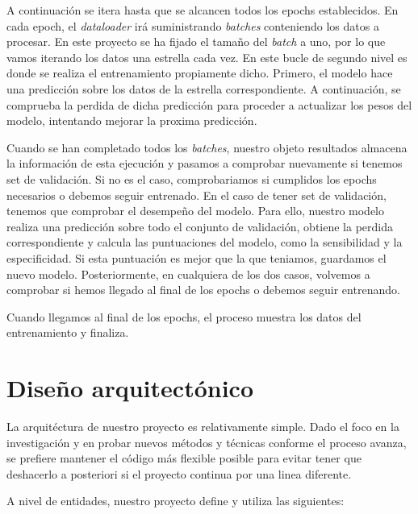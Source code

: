 A continuación se itera hasta que se alcancen todos los epochs establecidos. En cada epoch, el \textit{dataloader} irá suministrando \textit{batches} conteniendo los datos a procesar. En este proyecto se ha fijado el tamaño del \textit{batch} a uno, por lo que vamos iterando los datos una estrella cada vez. En este bucle de segundo nivel es donde se realiza el entrenamiento propiamente dicho. Primero, el modelo hace una predicción sobre los datos de la estrella correspondiente. A continuación, se comprueba la perdida de dicha predicción para proceder a actualizar los pesos del modelo, intentando mejorar la proxima predicción.

Cuando se han completado todos los \textit{batches}, nuestro objeto resultados almacena la información de esta ejecución y pasamos a comprobar nuevamente si tenemos set de validación. Si no es el caso, comprobariamos si cumplidos los epochs necesarios o debemos seguir entrenado. En el caso de tener set de validación, tenemos que comprobar el desempeño del modelo. Para ello, nuestro modelo realiza una predicción sobre todo el conjunto de validación, obtiene la perdida correspondiente y calcula las puntuaciones del modelo, como la sensibilidad y la especificidad. Si esta puntuación es mejor que la que teniamos, guardamos el nuevo modelo. Posteriormente, en cualquiera de los dos casos, volvemos a comprobar si hemos llegado al final de los epochs o debemos seguir entrenando.

Cuando llegamos al final de los epochs, el proceso muestra los datos del entrenamiento y finaliza.


\section{Diseño arquitectónico}

La arquitéctura de nuestro proyecto es relativamente simple. Dado el foco en la investigación y en probar nuevos métodos y técnicas conforme el proceso avanza, se prefiere mantener el código más flexible posible para evitar tener que deshacerlo a posteriori si el proyecto continua por una linea diferente.

A nivel de entidades, nuestro proyecto define y utiliza las siguientes:

